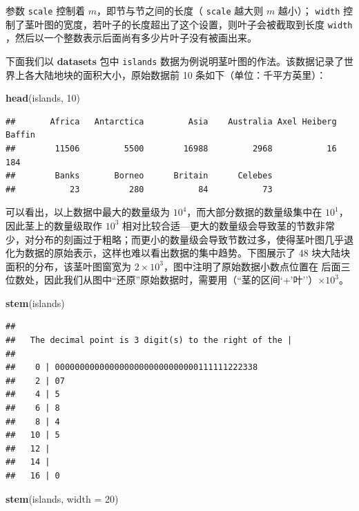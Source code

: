 \documentclass[
  b5paper,
  UTF8,twoside]{book}
\newenvironment{Shaded}{\begin{snugshade}}{\end{snugshade}}
\newcommand{\AttributeTok}[1]{\textcolor[rgb]{0.13,0.29,0.53}{#1}}
\newcommand{\DecValTok}[1]{\textcolor[rgb]{0.00,0.00,0.81}{#1}}
\newcommand{\FunctionTok}[1]{\textcolor[rgb]{0.13,0.29,0.53}{\textbf{#1}}}
\newcommand{\NormalTok}[1]{#1}
\begin{document}
参数 \texttt{scale} 控制着 \(m\)，即节与节之间的长度（ \texttt{scale} 越大则 \(m\) 越小）； \texttt{width} 控制了茎叶图的宽度，若叶子的长度超出了这个设置，则叶子会被截取到长度 \texttt{width} ，然后以一个整数表示后面尚有多少片叶子没有被画出来。

下面我们以 \textbf{datasets} 包中 \texttt{islands} 数据为例说明茎叶图的作法。该数据记录了世界上各大陆地块的面积大小，原始数据前 10 条如下（单位：千平方英里）：

\begin{Shaded}
\begin{Highlighting}[]
\FunctionTok{head}\NormalTok{(islands, }\DecValTok{10}\NormalTok{)}
\end{Highlighting}
\end{Shaded}

\begin{verbatim}
##       Africa   Antarctica         Asia    Australia Axel Heiberg       Baffin 
##        11506         5500        16988         2968           16          184 
##        Banks       Borneo      Britain      Celebes 
##           23          280           84           73
\end{verbatim}

可以看出，以上数据中最大的数量级为 \(10^{4}\)，而大部分数据的数量级集中在 \(10^{1}\)，因此茎上的数量级取作 \(10^{3}\) 相对比较合适---更大的数量级会导致茎的节数非常少，对分布的刻画过于粗略；而更小的数量级会导致节数过多，使得茎叶图几乎退化为数据的原始表示，这样也难以看出数据的集中趋势。下图展示了 48 块大陆块面积的分布，该茎叶图窗宽为 \(2\times10^{3}\)，图中注明了原始数据小数点位置在 \texttt{\textbar{}} 后面三位数处，因此我们从图中``还原''原始数据时，需要用（``茎的区间`+'叶''）\(\times10^{3}\)。

\begin{Shaded}
\begin{Highlighting}[]
\FunctionTok{stem}\NormalTok{(islands)}
\end{Highlighting}
\end{Shaded}

\begin{verbatim}
## 
##   The decimal point is 3 digit(s) to the right of the |
## 
##    0 | 00000000000000000000000000000111111222338
##    2 | 07
##    4 | 5
##    6 | 8
##    8 | 4
##   10 | 5
##   12 | 
##   14 | 
##   16 | 0
\end{verbatim}

\begin{Shaded}
\begin{Highlighting}[]
\FunctionTok{stem}\NormalTok{(islands, }\AttributeTok{width =} \DecValTok{20}\NormalTok{)}
\end{Highlighting}
\end{Shaded}
\end{document}
